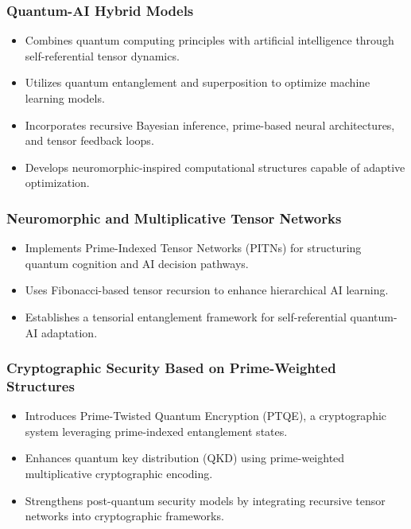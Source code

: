 \documentclass{article}
\theoremstyle{plain}
\begin{document}
\begin{itemize}
\subsubsection{Quantum-AI Hybrid Models}
\begin{itemize}
    \item Combines quantum computing principles with artificial intelligence through self-referential tensor dynamics.
    \item Utilizes quantum entanglement and superposition to optimize machine learning models.
    \item Incorporates recursive Bayesian inference, prime-based neural architectures, and tensor feedback loops.
    \item Develops neuromorphic-inspired computational structures capable of adaptive optimization.
\end{itemize}

\subsubsection{Neuromorphic and Multiplicative Tensor Networks}
\begin{itemize}
    \item Implements Prime-Indexed Tensor Networks (PITNs) for structuring quantum cognition and AI decision pathways.
    \item Uses Fibonacci-based tensor recursion to enhance hierarchical AI learning.
    \item Establishes a tensorial entanglement framework for self-referential quantum-AI adaptation.
\end{itemize}

\subsubsection{Cryptographic Security Based on Prime-Weighted Structures}
\begin{itemize}
    \item Introduces Prime-Twisted Quantum Encryption (PTQE), a cryptographic system leveraging prime-indexed entanglement states.
    \item Enhances quantum key distribution (QKD) using prime-weighted multiplicative cryptographic encoding.
    \item Strengthens post-quantum security models by integrating recursive tensor networks into cryptographic frameworks.
\end{itemize}


\end{itemize}
\end{document}
